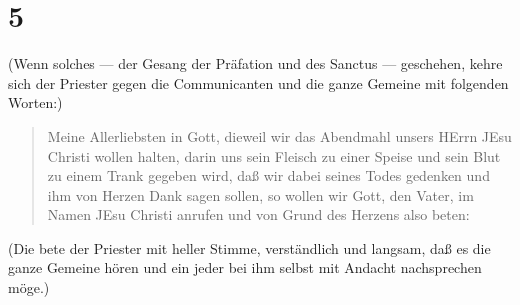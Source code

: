 \section{5}

(Wenn solches — der Gesang der Präfation und des Sanctus — geschehen, kehre sich der Priester gegen die Communicanten und die ganze Gemeine mit folgenden Worten:)

\begin{quote}
Meine Allerliebsten in Gott, dieweil wir das Abendmahl unsers HErrn JEsu Christi wollen halten, darin uns sein Fleisch zu einer Speise und sein Blut zu einem Trank gegeben wird, daß wir dabei seines Todes gedenken und ihm von Herzen Dank sagen sollen, so wollen wir Gott, den Vater, im Namen JEsu Christi anrufen und von Grund des Herzens also beten:
\end{quote}

(Die bete der Priester mit heller Stimme, verständlich und langsam, daß es die ganze Gemeine hören und ein jeder bei ihm selbst mit Andacht nachsprechen möge.)

